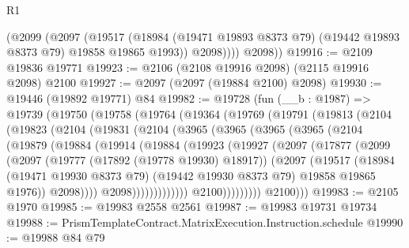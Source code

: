 \begin{lexlean}{R1}
\begin{coremodule}
            (@2099
              (@2097
                (@19517
                  (@18984 (@19471 @19893 @8373 @79) (@19442 @19893 @8373 @79) @19858 @19865 @1993))
                @2098))))
        @2098))
@19916 := @2109 @19836 @19771
@19923 := @2106 (@2108 @19916 @2098) (@2115 @19916 @2098) @2100
@19927 := @2097 (@2097 (@19884 @2100) @2098)
@19930 := @19446 (@19892 @19771) @84
@19982 := @19728
    (fun (__b : @1987) =>
    @19739
      (@19750
        (@19758
          (@19764
            (@19364
              (@19769
                (@19791
                  (@19813
                    (@2104
                      (@19823
                        (@2104
                          (@19831
                            (@2104
                              (@3965
                                (@3965
                                  (@3965
                                    (@3965
                                      (@2104
                                        (@19879
                                          (@19884
                                            (@19914
                                              (@19884
                                                (@19923
                                                  (@19927
                                                    (@2097
                                                      (@17877
                                                        (@2099
                                                          (@2097
                                                            (@19777 (@17892 (@19778 @19930) @18917))
                                                            (@2097
                                                              (@19517
                                                                (@18984
                                                                  (@19471 @19930 @8373 @79)
                                                                  (@19442 @19930 @8373 @79)
                                                                  @19858
                                                                  @19865
                                                                  @1976))
                                                              @2098))))
                                                      @2098)))))))))))))
                            @2100)))))))))
          @2100)))
@19983 := @2105 @1970
@19985 := @19983 @2558 @2561
@19987 := @19983 @19731 @19734
@19988 := PrismTemplateContract.MatrixExecution.Instruction.schedule
@19990 := @19988 @84 @79

\end{coremodule}
\end{lexlean}
